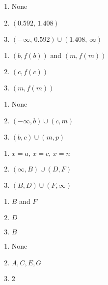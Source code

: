 \begin{multicols}{3}
\begin{enumerate}	\setcounter{enumi}{\value{Review}} 
    \item None
    \item $(0.592, \, 1.408)$
    \item $(-\infty, \, 0.592) \cup (1.408, \, \infty)$
\end{enumerate}	\setcounter{Review}{\value{enumi}}
\end{multicols}
\begin{multicols}{3}
\begin{enumerate}	\setcounter{enumi}{\value{Review}} 
	\item $(b, f(b))$ and $(m, f(m))$
	\item $(c, f(c))$
	\item $(m, f(m))$
\end{enumerate}	\setcounter{Review}{\value{enumi}}
\end{multicols}
\begin{multicols}{3}
\begin{enumerate}	\setcounter{enumi}{\value{Review}} 
	\item None
	\item $(-\infty, b) \cup (c, m)$
	\item $(b, c) \cup (m, p)$
\end{enumerate}	\setcounter{Review}{\value{enumi}}
\end{multicols}
\begin{multicols}{3}
\begin{enumerate}	\setcounter{enumi}{\value{Review}} 
	\item $x = a, \, x = c, \, x = n$
    \item $(\infty, B) \cup (D, F)$
    \item $(B, D) \cup (F, \infty)$
\end{enumerate}	\setcounter{Review}{\value{enumi}}
\end{multicols}
\begin{multicols}{3}
\begin{enumerate}	\setcounter{enumi}{\value{Review}} 
    \item $B$ and $F$
    \item $D$
    \item $B$
\end{enumerate}	\setcounter{Review}{\value{enumi}}
\end{multicols}
\begin{multicols}{3}
\begin{enumerate}	\setcounter{enumi}{\value{Review}} 
    \item None
    \item $A, C, E, G$
    \item 2
\end{enumerate}	\setcounter{Review}{\value{enumi}}
\end{multicols}
